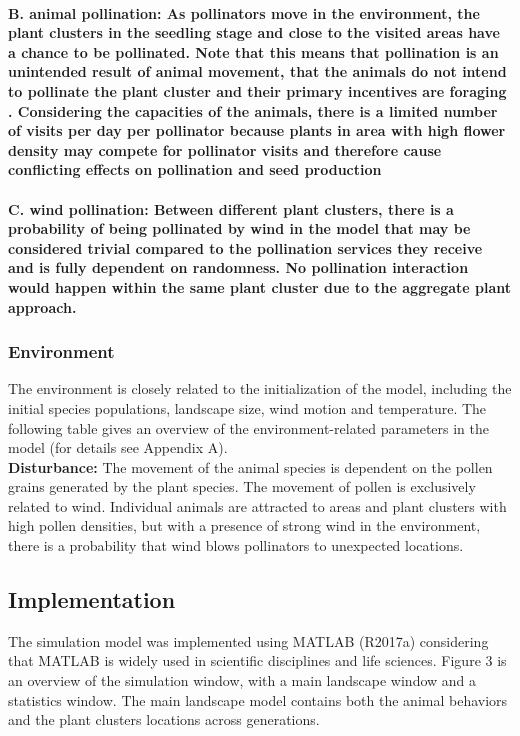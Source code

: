 \documentclass[3p,,preprint,12pt]{elsarticle}
\begin{document}
\paragraph{\textbf{B. animal pollination}: As pollinators move in the environment, the plant clusters in the seedling stage and close to the visited areas have a chance to be pollinated. Note that this means that pollination is an unintended result of animal movement, that the animals do not intend to pollinate the plant cluster and their primary incentives are foraging \cite{10.2307/25562589}. Considering the capacities of the animals, there is a limited number of visits per day per pollinator because plants in area with high flower density may compete for pollinator visits and therefore cause conflicting effects on pollination and seed production \cite{10.3732/ajb.0800260}}

\paragraph{\textbf{C. wind pollination}: Between different plant clusters, there is a probability of being pollinated by wind in the model that may be considered trivial compared to the pollination services they receive and is fully dependent on randomness. No pollination interaction would happen within the same plant cluster due to the aggregate plant approach.}

\subsubsection{Environment}
The environment is closely related to the initialization of the model, including the initial species populations, landscape size, wind motion and temperature. The following table gives an overview of the environment-related parameters in the model (for details see Appendix A). \\

\noindent\textbf{Disturbance:} The movement of the animal species is dependent on the pollen grains generated by the plant species. The movement of pollen is exclusively related to wind. Individual animals are attracted to areas and plant clusters with high pollen densities, but with a presence of strong wind in the environment, there is a probability that wind blows pollinators to unexpected locations.

\subsection{Implementation}
The simulation model was implemented using MATLAB (R2017a) considering that MATLAB is widely used in scientific disciplines and life sciences. Figure 3 is an overview of the simulation window, with a  main landscape window and a statistics window. The main landscape model contains both the animal behaviors and the plant clusters locations across generations. 
\end{document}
